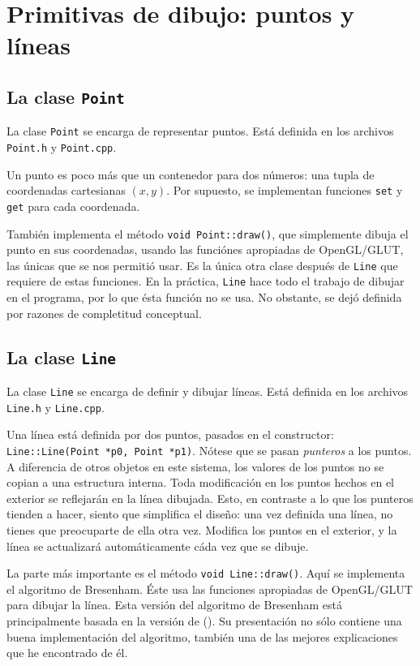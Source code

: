 \section{Primitivas de dibujo: puntos y líneas}
\label{primitivas_dibujo}

\subsection{La clase \lstinline!Point!}

La clase \lstinline!Point! se encarga de representar puntos. Está definida en
los archivos \lstinline!Point.h! y \lstinline!Point.cpp!.

Un punto es poco más que un contenedor para dos números: una tupla de coordenadas
cartesianas $(x, y)$. Por supuesto, se implementan funciones \lstinline!set! y
\lstinline!get! para cada coordenada.

También implementa el método \lstinline!void Point::draw()!, que simplemente dibuja
el punto en sus coordenadas, usando las funciónes apropiadas de OpenGL/GLUT, las
únicas que se nos permitió usar. Es la única
otra clase después de \lstinline!Line! que requiere de estas funciones. En la práctica,
\lstinline!Line! hace todo el trabajo de dibujar en el programa, por lo que ésta
función no se usa. No obstante, se dejó definida por razones de completitud conceptual.

\subsection{La clase \lstinline!Line!}

La clase \lstinline!Line! se encarga de definir y dibujar líneas. Está definida en
los archivos \lstinline!Line.h! y \lstinline!Line.cpp!.

Una línea está definida por dos puntos, pasados en el constructor: \lstinline!Line::Line(Point *p0, Point *p1)!.
Nótese que se pasan \emph{punteros} a los puntos. A diferencia de otros objetos en este
sistema, los valores de los puntos no se copian a una estructura interna. Toda modificación
en los puntos hechos en el exterior se reflejarán en la línea dibujada. Esto, en contraste
a lo que los punteros tienden a hacer, siento que simplifica el diseño: una vez
definida una línea, no tienes que preocuparte de ella otra vez. Modifica los puntos en
el exterior, y la línea se actualizará automáticamente cáda vez que se dibuje.

La parte más importante es el método \lstinline!void Line::draw()!. Aquí se implementa el
algoritmo de Bresenham. Éste usa las funciones apropiadas de OpenGL/GLUT para dibujar
la línea. Esta versión del algoritmo de Bresenham está principalmente basada en
la versión de \citeauthor{bresenham} (\citeyear{bresenham}). Su presentación no sólo
contiene una buena implementación del algoritmo, también una de las mejores explicaciones
que he encontrado de él.
